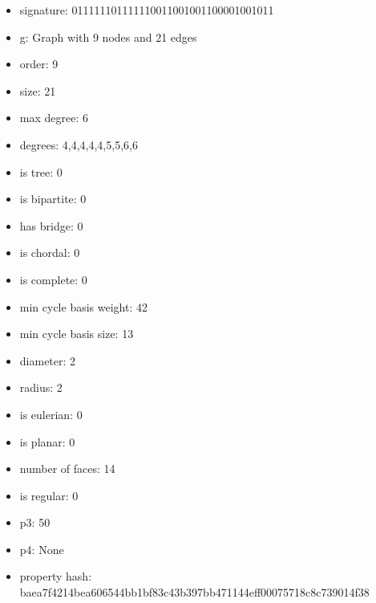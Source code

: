 \newpage
\begin{figure}
\end{figure}
\begin{itemize}
\item signature: 011111101111110011001001100001001011
\item g: Graph with 9 nodes and 21 edges
\item order: 9
\item size: 21
\item max degree: 6
\item degrees: 4,4,4,4,4,5,5,6,6
\item is tree: 0
\item is bipartite: 0
\item has bridge: 0
\item is chordal: 0
\item is complete: 0
\item min cycle basis weight: 42
\item min cycle basis size: 13
\item diameter: 2
\item radius: 2
\item is eulerian: 0
\item is planar: 0
\item number of faces: 14
\item is regular: 0
\item p3: 50
\item p4: None
\item property hash: baea7f4214bea606544bb1bf83c43b397bb471144eff00075718c8c739014f38
\end{itemize}
